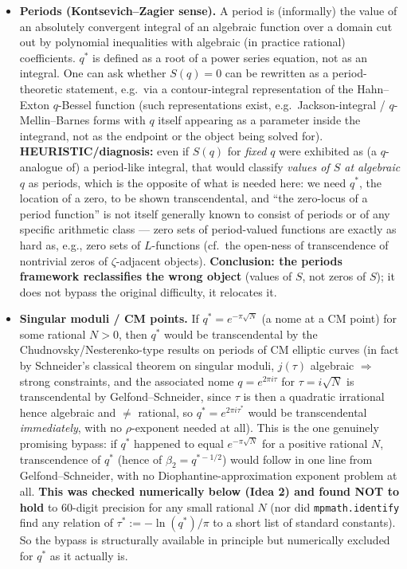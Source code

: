 \documentclass[11pt]{article}
\begin{document}
\begin{itemize}
\item \textbf{Periods (Kontsevich--Zagier sense).} A period is (informally) the value of an
absolutely convergent integral of an algebraic function over a domain cut out by polynomial
inequalities with algebraic (in practice rational) coefficients. $q^\ast$ is defined as a root
of a power series equation, not as an integral. One can ask whether $S(q)=0$ can be rewritten as
a period-theoretic statement, e.g.\ via a contour-integral representation of the Hahn--Exton
$q$-Bessel function (such representations exist, e.g.\ Jackson-integral / $q$-Mellin--Barnes
forms with $q$ itself appearing as a parameter inside the integrand, not as the endpoint or the
object being solved for). \textbf{HEURISTIC/diagnosis:} even if $S(q)$ for \emph{fixed} $q$ were
exhibited as (a $q$-analogue of) a period-like integral, that would classify \emph{values of
$S$ at algebraic $q$} as periods, which is the opposite of what is needed here: we need
$q^\ast$, the location of a zero, to be shown transcendental, and ``the zero-locus of a period
function'' is not itself generally known to consist of periods or of any specific arithmetic
class --- zero sets of period-valued functions are exactly as hard as, e.g., zero sets of
$L$-functions (cf.\ the open-ness of transcendence of nontrivial zeros of $\zeta$-adjacent
objects). \textbf{Conclusion: the periods framework reclassifies the wrong object} (values of
$S$, not zeros of $S$); it does not bypass the original difficulty, it relocates it.

\item \textbf{Singular moduli / CM points.} If $q^\ast=e^{-\pi\sqrt N}$ (a nome at a CM point)
for some rational $N>0$, then $q^\ast$ would be transcendental by the Chudnovsky/Nesterenko-type
results on periods of CM elliptic curves (in fact by Schneider's classical theorem on singular
moduli, $j(\tau)$ algebraic $\Rightarrow$ strong constraints, and the associated nome
$q=e^{2\pi i\tau}$ for $\tau=i\sqrt N$ is transcendental by Gelfond--Schneider, since $\tau$ is
then a quadratic irrational hence algebraic and $\ne$ rational, so $q^\ast=e^{2\pi i\tau^\ast}$
would be transcendental \emph{immediately}, with no $\rho$-exponent needed at all). This is
the one genuinely promising bypass: if $q^\ast$ happened to equal $e^{-\pi\sqrt N}$ for a
positive rational $N$, transcendence of $q^\ast$ (hence of $\beta_2=q^{\ast-1/2}$) would follow
in one line from Gelfond--Schneider, with no Diophantine-approximation exponent problem at all.
\textbf{This was checked numerically below (Idea 2) and found NOT to hold} to 60-digit
precision for any small rational $N$ (nor did \texttt{mpmath.identify} find any relation of
$\tau^\ast:=-\ln(q^\ast)/\pi$ to a short list of standard constants). So the bypass is
structurally available in principle but numerically excluded for $q^\ast$ as it actually is.
\end{itemize}
\end{document}
